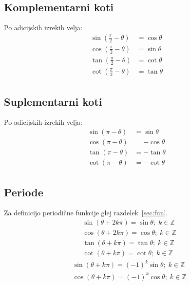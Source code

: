\documentclass[a4paper,oneside,12pt,fleqn]{article}
\def\Z{\ensuremath{\mathbb Z}}
\def\kos{\cos}
\numberwithin{equation}{section}
\begin{document}
\parbox[t]{0.5\textwidth}{\subsection{Komplementarni koti}
\label{sec:kot:kompl}
Po adicijskih izrekih velja:
\begin{align*}
  \sin\left(\frac{\pi}{2} - \theta\right) &= \kos\theta \\
  \kos\left(\frac{\pi}{2} - \theta\right) &= \sin\theta \\
  \tan\left(\frac{\pi}{2} - \theta\right) &= \cot\theta \\
  \cot\left(\frac{\pi}{2} - \theta\right) &= \tan\theta \\
\end{align*}}
\parbox[t]{0.5\textwidth}{
\subsection{Suplementarni koti}
\label{sec:kot:supl}
Po adicijskih izrekih velja:
\begin{align*}
  \sin\left(\pi - \theta\right) &= \sin\theta \\
  \kos\left(\pi - \theta\right) &= -\kos\theta \\
  \tan\left(\pi - \theta\right) &= -\tan\theta \\
  \cot\left(\pi - \theta\right) &= -\cot\theta \\
\end{align*}}

\subsection{Periode}
\label{sec:kot:periode}
Za definicijo periodične funkcije glej razdelek~\ref{sec:fun}.
\begin{align*}
  &\sin(\theta+2k\pi) = \sin\theta; \; k \in \Z \\
  &\kos(\theta+2k\pi) = \cos\theta; \; k \in \Z \\
  &\tan(\theta+k\pi) = \tan\theta; \; k \in \Z \\
  &\cot(\theta+k\pi) = \cot\theta; \; k \in \Z
\end{align*}
\begin{align*}
  &\sin(\theta+k\pi) = (-1)^k\sin\theta; \; k \in \Z \\
  &\kos(\theta+k\pi) = (-1)^k\cos\theta; \; k \in \Z \\
\end{align*}
\end{document}
